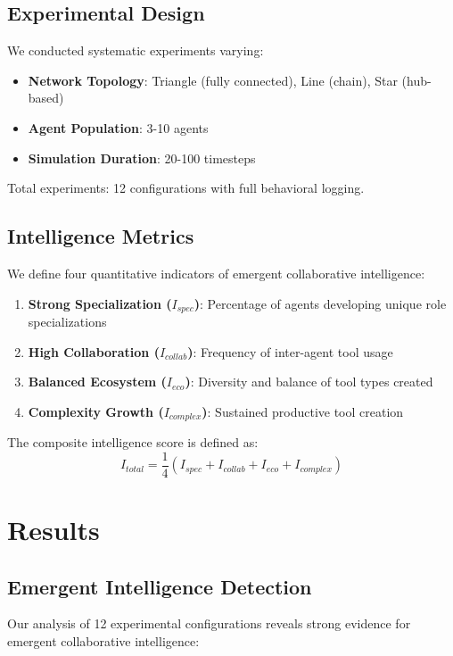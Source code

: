 \documentclass[10pt,twocolumn]{article}
\begin{document}
\subsection{Experimental Design}

We conducted systematic experiments varying:
\begin{itemize}
\item \textbf{Network Topology}: Triangle (fully connected), Line (chain), Star (hub-based)
\item \textbf{Agent Population}: 3-10 agents
\item \textbf{Simulation Duration}: 20-100 timesteps
\end{itemize}

Total experiments: 12 configurations with full behavioral logging.

\subsection{Intelligence Metrics}

We define four quantitative indicators of emergent collaborative intelligence:

\begin{enumerate}
\item \textbf{Strong Specialization ($I_{spec}$)}: Percentage of agents developing unique role specializations
\item \textbf{High Collaboration ($I_{collab}$)}: Frequency of inter-agent tool usage
\item \textbf{Balanced Ecosystem ($I_{eco}$)}: Diversity and balance of tool types created
\item \textbf{Complexity Growth ($I_{complex}$)}: Sustained productive tool creation
\end{enumerate}

The composite intelligence score is defined as:
$$I_{total} = \frac{1}{4}(I_{spec} + I_{collab} + I_{eco} + I_{complex})$$

\section{Results}

\subsection{Emergent Intelligence Detection}

Our analysis of 12 experimental configurations reveals strong evidence for emergent collaborative intelligence:
\end{document}
